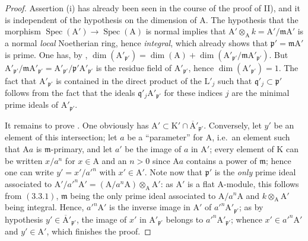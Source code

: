 \begin{proof}
Assertion (i) has already been seen in the course of the proof of II), and it is independent of the hypothesis on the dimension of $\mathrm{A}$. The hypothesis that the morphism
$\operatorname{Spec}(\mathrm{A}')\to\operatorname{Spec}(\mathrm{A})$ is normal implies that $\mathrm{A}'\otimes_\mathrm{A} k=\mathrm{A}'/\mathfrak{m}\mathrm{A}'$ is a normal \emph{local}
Noetherian ring, hence \emph{integral}, which already shows that $\mathfrak{p}'=\mathfrak{m}\mathrm{A}'$ is prime. One has,
by , $\dim(\mathrm{A}'_{\mathfrak{p}'})=\dim(\mathrm{A})+\dim(\mathrm{A}'_{\mathfrak{p}'}/\mathfrak{m}\mathrm{A}'_{\mathfrak{p}'})$. But $\mathrm{A}'_{\mathfrak{p}'}/\mathfrak{m}\mathrm{A}'_{\mathfrak{p}'}=\mathrm{A}'_{\mathfrak{p}'}/\mathfrak{p}'\mathrm{A}'_{\mathfrak{p}'}$ is
the residue field of $\mathrm{A}'_{\mathfrak{p}'}$, hence $\dim(\mathrm{A}'_{\mathfrak{p}'})=1$. The fact that $\mathrm{A}'_{\mathfrak{p}'}$ is contained in the direct
product of the $\mathrm{L}'_j$ such that $\mathfrak{q}'_j\subset\mathfrak{p}'$ follows from the fact that the ideals $\mathfrak{q}'_j\mathrm{A}'_{\mathfrak{p}'}$ for these indices $j$ are
the minimal prime ideals of $\mathrm{A}'_{\mathfrak{p}'}$.

It remains to prove . One obviously has $\mathrm{A}'\subset\mathrm{K}'\cap\overline{\mathrm{A}}'_{\mathfrak{p}'}$. Conversely, let $y'$ be an
element of this intersection; let $a$ be a ``parameter'' for $\mathrm{A}$, i.e.\ an element such that $\mathrm{A}a$ is $\mathfrak{m}$-primary,
and let $a'$ be the image of $a$ in $\mathrm{A}'$; every element of $\mathrm{K}$ can be written $x/a^n$ for $x\in\mathrm{A}$ and an
$n>0$ since $\mathrm{A}a$ contains a power of $\mathfrak{m}$; hence one can write $y'=x'/a'^n$ with $x'\in\mathrm{A}'$.
Note now that $\mathfrak{p}'$ is the \emph{only} prime ideal associated to $\mathrm{A}'/a'^n\mathrm{A}'=(\mathrm{A}/a^n\mathrm{A})\otimes_\mathrm{A}\mathrm{A}'$:
as $\mathrm{A}'$ is a flat $\mathrm{A}$-module, this follows from $(3.3.1)$, $\mathfrak{m}$ being the only prime ideal
associated to $\mathrm{A}/a^n\mathrm{A}$ and $k\otimes_\mathrm{A}\mathrm{A}'$ being integral. Hence, $a'^n\mathrm{A}'$ is the inverse image in $\mathrm{A}'$
of $a'^n\mathrm{A}'_{\mathfrak{p}'}$; as by hypothesis $y'\in\overline{\mathrm{A}}'_{\mathfrak{p}'}$, the image of $x'$ in $\mathrm{A}'_{\mathfrak{p}'}$ belongs to $a'^n\mathrm{A}'_{\mathfrak{p}'}$;
whence $x'\in a'^n\mathrm{A}'$ and $y'\in\mathrm{A}'$, which finishes the proof.


\end{proof}
